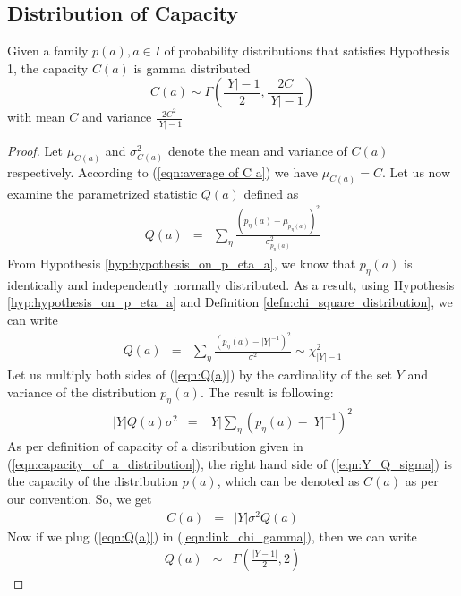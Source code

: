 \subsection{Distribution of Capacity}
\begin{theorem}\label{general capacity distribution}
Given a family $p(a), a \in I$ of probability distributions that satisfies Hypothesis 1, the capacity $C(a)$ is gamma distributed $$C(a) \sim \Gamma\left(\frac{|Y|-1}{2},\frac{2C}{|Y|-1}\right)$$ with mean $C$ and variance $\frac{2C^2}{|Y|-1}$
\end{theorem}
\begin{proof}
Let $\mu_{C(a)}$ and $\sigma^{2}_{C(a)}$ denote the mean and variance of $C(a)$ respectively. According to (\ref{eqn:average of C a}) we have $\mu_{C(a)} = C$. Let us now examine the parametrized statistic $Q(a)$ defined as
\begin{eqnarray}
Q(a) &=& \displaystyle\sum_{\eta}\frac{\left(p_{\eta}(a) - \mu_{p_{\eta}(a)}\right)^2}{\sigma^{2}_{p_{\eta}(a)}} 
\end{eqnarray}
From Hypothesis \ref{hyp:hypothesis_on_p_eta_a}, we know that $p_{\eta}(a)$ is identically and independently normally distributed. As a result, using Hypothesis \ref{hyp:hypothesis_on_p_eta_a} and Definition  \ref{defn:chi_square_distribution}, we can write
\begin{eqnarray}
Q\left(a\right) &=& \displaystyle\sum_{\eta}\frac{(p_{\eta}(a) - |Y|^{-1})^2}{\sigma^{2}} \sim  \chi^2_{|Y|-1} \label{eqn:Q(a)}
\end{eqnarray}
Let us multiply both sides of (\ref{eqn:Q(a)}) by the cardinality of the set $Y$ and variance of the distribution $p_{\eta}(a)$.  The result is following:
\begin{eqnarray}
|Y|Q(a)\sigma^{2} &=& |Y|\displaystyle\sum_{\eta}\left(p_{\eta}(a) - |Y|^{-1}\right)^2 \label{eqn:Y_Q_sigma}
\end{eqnarray}
As per definition of capacity of a distribution given in (\ref{eqn:capacity_of_a_distribution}), the right hand side of (\ref{eqn:Y_Q_sigma}) is the capacity of the distribution $p(a)$, which can be denoted as $C(a)$ as per our convention. So, we get
\begin{eqnarray*}
C(a) &=& |Y|\sigma^{2}Q(a)
\end{eqnarray*}
Now if we plug (\ref{eqn:Q(a)}) in (\ref{eqn:link_chi_gamma}), then we can write 
\begin{eqnarray}
Q(a) &\sim& \Gamma\left(\frac{|Y-1|}{2},2\right) \label{eqn:Q_gamma_distributed}
\end{eqnarray}

\end{proof}
